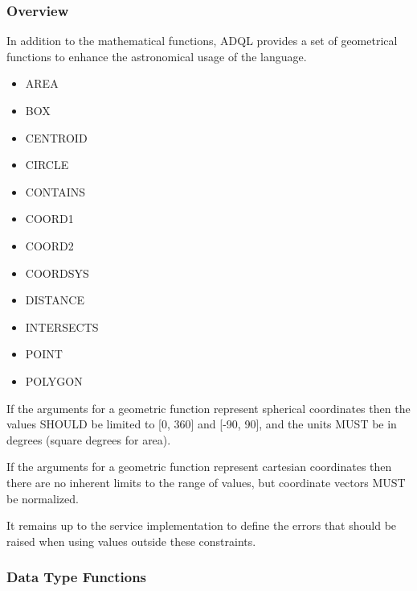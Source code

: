 \documentclass[11pt,a4paper]{ivoa}
\begin{document}
\subsubsection{Overview}
\label{sec:functions.geom.overview}

In addition to the mathematical functions, ADQL provides a set of geometrical
functions to enhance the astronomical usage of the language.

\begin{itemize}
    \item AREA
    \item BOX
    \item CENTROID
    \item CIRCLE
    \item CONTAINS
    \item COORD1
    \item COORD2
    \item COORDSYS
    \item DISTANCE
    \item INTERSECTS
    \item POINT
    \item POLYGON
\end{itemize}

If the arguments for a geometric function represent spherical coordinates
then the values SHOULD be limited to [0, 360] and [-90, 90],
and the units MUST be in degrees (square degrees for area).
            
If the arguments for a geometric function represent cartesian coordinates
then there are no inherent limits to the range of values, but
coordinate vectors MUST be normalized.

It remains up to the service implementation to define the errors that
should be raised when using values outside these constraints.


\subsubsection{Data Type Functions}
\label{sec:functions.geom.type}
\end{document}
